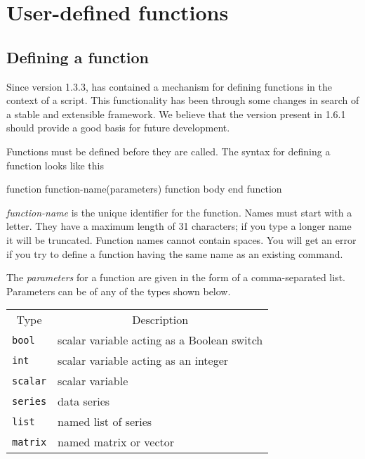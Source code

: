 \chapter{User-defined functions}
\label{functions}

\section{Defining a function}
\label{func-define}

Since version 1.3.3,  has contained a mechanism for
defining functions in the context of a script.  This functionality has
been through some changes in search of a stable and extensible
framework.  We believe that the version present in  1.6.1
should provide a good basis for future development.

Functions must be defined before they are called.  The syntax for
defining a function looks like this
    
\begin{code}
      function function-name(parameters)
         function body
      end function
\end{code}

\textsl{function-name} is the unique identifier for the function.
Names must start with a letter. They have a maximum length of 31
characters; if you type a longer name it will be truncated.  Function
names cannot contain spaces.  You will get an error if you try to
define a function having the same name as an existing 
command.

The \textsl{parameters} for a function are given in the form of a
comma-separated list.  Parameters can be of any of the types shown
below.

\begin{center}
\begin{tabular}{ll}
\multicolumn{1}{c}{Type} & 
\multicolumn{1}{c}{Description} \\ [4pt]
\texttt{bool} & scalar variable acting as a Boolean switch \\
\texttt{int}  & scalar variable acting as an integer  \\
\texttt{scalar} & scalar variable \\
\texttt{series} & data series \\
\texttt{list}   & named list of series \\
\texttt{matrix} & named matrix or vector 
\end{tabular}
\end{center}

